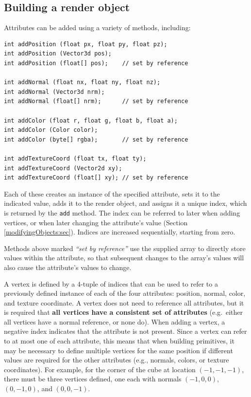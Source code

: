 \subsection{Building a render object}
\label{buildingRenderObjects:sec}

Attributes can be added using a variety of
 methods, including:
%
\begin{lstlisting}[]
int addPosition (float px, float py, float pz);
int addPosition (Vector3d pos);
int addPosition (float[] pos);    // set by reference

int addNormal (float nx, float ny, float nz);
int addNormal (Vector3d nrm);
int addNormal (float[] nrm);      // set by reference

int addColor (float r, float g, float b, float a);
int addColor (Color color);
int addColor (byte[] rgba);       // set by reference

int addTextureCoord (float tx, float ty);
int addTextureCoord (Vector2d xy);
int addTextureCoord (float[] xy); // set by reference
\end{lstlisting}
%
Each of these creates an instance of the specified attribute, sets it
to the indicated value, adds it to the render object, and assigns it a
unique index, which is returned by the {\tt add} method. The index can
be referred to later when adding vertices, or when later changing the
attribute's value (Section \ref{modifyingObjects:sec}). Indices are
increased sequentially, starting from zero.

\begin{sideblock}
Methods above marked {\it ``set by reference''} use the supplied array to
directly store values within the attribute, so that subsequent changes to
the array's values will also cause the attribute's values to change.
\end{sideblock}

A vertex is defined by a 4-tuple of indices that can be used to refer
to a previously defined instance of each of the four attributes:
position, normal, color, and texture coordinate. A vertex does not
need to reference all attributes, but it is required that {\bf
all vertices have a consistent set of attributes} (e.g.~either all
vertices have a normal reference, or none do).  When adding a vertex, a
negative index indicates that the attribute is not present. Since a
vertex can refer to at most one of each attribute, this means that
when building primitives, it may be necessary to define multiple
vertices for the same position if different values are required for
the other attributes (e.g., normals, colors, or texture coordinates).
For example, for the corner of the cube at location $(-1,-1,-1)$,
there must be three vertices defined, one each with normals
$(-1,0,0)$, $(0,-1,0)$, and $(0,0,-1)$.

